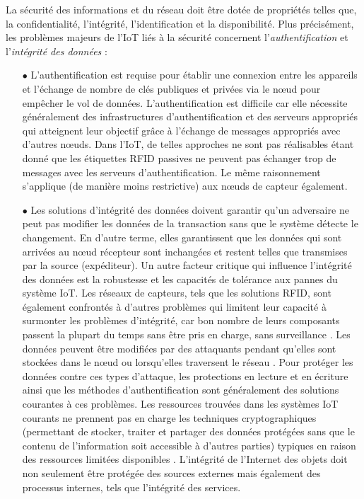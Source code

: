 La sécurité des informations et du réseau doit être dotée de propriétés telles que, la conf{\kern0pt}identialité, l'intégrité, l'identif{\kern0pt}ication et la disponibilité. Plus précisément, les problèmes majeurs de l’IoT liés à la sécurité concernent l'\textit{authentif{\kern0pt}ication} et l'\textit{intégrité des données} \cite{atzori2010iot} : 
\begin{itemize}
	\item[$\bullet$] L'authentif{\kern0pt}ication est requise pour établir une connexion entre les appareils et l'échange de nombre de clés publiques et privées via le nœud pour empêcher le vol de données. L'authentif{\kern0pt}ication est dif{\kern0pt}f{\kern0pt}icile car elle nécessite généralement des infrastructures d'authentif{\kern0pt}ication et des serveurs appropriés qui atteignent leur objectif grâce à l'échange de messages appropriés avec d'autres nœuds. Dans l'IoT, de telles approches ne sont pas réalisables étant donné que les étiquettes RFID passives ne peuvent pas échanger trop de messages avec les serveurs d'authentif{\kern0pt}ication. Le même raisonnement s'applique (de manière moins restrictive) aux nœuds de capteur également.	
	\item[$\bullet$] Les solutions d'intégrité des données doivent garantir qu'un adversaire ne peut pas modif{\kern0pt}ier les données de la transaction sans que le système détecte le changement. En d’autre terme, elles garantissent que les données qui sont arrivées au nœud récepteur sont inchangées et restent telles que transmises par la source (expéditeur). Un autre facteur critique qui influence l'intégrité des données est la robustesse et les capacités de tolérance aux pannes du système IoT. Les réseaux de capteurs, tels que les solutions RFID, sont également confrontés à d'autres problèmes qui limitent leur capacité à surmonter les problèmes d'intégrité, car bon nombre de leurs composants passent la plupart du temps sans être pris en charge, sans surveillance \cite{musonda2018iot}. Les données peuvent être modif{\kern0pt}iées par des attaquants pendant qu'elles sont stockées dans le nœud ou lorsqu'elles traversent le réseau \cite{karygiannis2007guidelines}. Pour protéger les données contre ces types d'attaque, les protections en lecture et en écriture ainsi que les méthodes d'authentif{\kern0pt}ication sont généralement des solutions courantes à ces problèmes. Les ressources trouvées dans les systèmes IoT courants ne prennent pas en charge les techniques cryptographiques (permettant de stocker, traiter et partager des données protégées sans que le contenu de l'information soit accessible à d'autres parties) typiques en raison des ressources limitées disponibles \cite{musonda2018iot}. L'intégrité de l'Internet des objets doit non seulement être protégée des sources externes mais également des processus internes, tels que l'intégrité des services.
\end{itemize}


